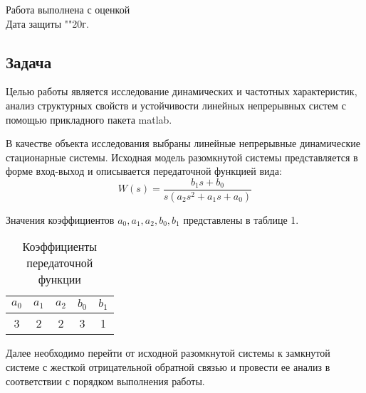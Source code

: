 \documentclass[a4paper, 12pt]{article}
\begin{document}
\begin{titlepage}
	Работа выполнена с оценкой \hspace{1cm} \underline{\hspace{8cm}} \\ 
	\vspace{1cm}
	Дата защиты "\underline{\hspace{0.7cm}}"\hspace{0.2cm}\underline{\hspace{2cm}}\hspace{0.2cm}20\underline{\hspace{0.7cm}}г.
	
\end{titlepage}	

\begin{center}
\section{Задача}
\end{center} \par
Целью работы является исследование динамических и частотных характеристик, анализ структурных свойств и устойчивости линейных непрерывных систем с помощью прикладного пакета matlab. \par
В качестве объекта исследования выбраны линейные непрерывные динамические стационарные системы. Исходная модель разомкнутой системы представляется в форме вход-выход и описывается передаточной функцией вида: 
\begin{equation} 
    W(s) = \frac{b_1s + b_0}{s(a_2s^2 + a_1s + a_0)}
\end{equation} \par
Значения коэффициентов $a_0, a_1, a_2, b_0, b_1$ представлены в таблице 1. \par
\begin{table} [h!]
    \centering
    \begin{threeparttable}
        \caption{Коэффициенты передаточной функции}
        \begin{tabular}{|c|c|c|c|c|}
            \hline
            $a_0$ & $a_1$ & $a_2$ & $b_0$ & $b_1$ \\ \hline
            3 & 2 & 2 & 3 & 1 \\ \hline
        \end{tabular}
    \end{threeparttable}
\end{table}
Далее необходимо перейти от исходной разомкнутой системы к замкнутой системе с жесткой отрицательной обратной связью и провести ее анализ в соответствии с порядком выполнения работы.
\end{document}
